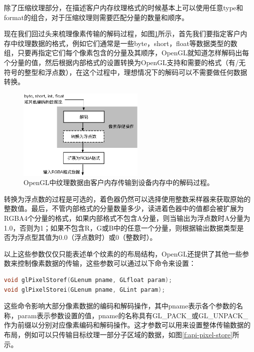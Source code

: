 除了压缩纹理部分，在描述客户内存纹理格式的时候基本上可以使用任意type和format的组合，对于压缩纹理则需要匹配分量的数量和顺序。

现在我们回过头来梳理像素传输的解码过程，如图\ref{f:api-unpack}所示，首先我们要指定客户内存中纹理数据的格式，例如它们通常是一些byte，short，float等数据类型的数组，只要再指定它们每个像素包含的分量及其顺序，OpenGL就知道怎样解码出每个分量的值，然后根据内部格式的设置转换为OpenGL支持和需要的格式（有/无符号的整型和浮点数），在这个过程中，理想情况下的解码可以不需要做任何数据转换。

\begin{figure}
\sidecaption
	\includegraphics[width=0.55\textwidth]{figures/api/unpack}
	\caption{OpenGL中纹理数据由客户内存传输到设备内存中的解码过程。}
	\label{f:api-unpack}
\end{figure}

转换为浮点数的过程是可选的，着色器仍然可以选择使用整数采样器来获取原始的整数值。最后，不管内部格式的分量数量多少，读进着色器中的值都会被扩展为RGBA4个分量的格式，如果内部格式不包含A分量，则当输出为浮点数时A分量为1.0，否则为1；如果不包含R，G或B中的任意一个分量，则根据输出数据类型是否为浮点型其值为0.0（浮点数时）或0（整数时）。

以上这些参数仅仅只能表述单个纹素的的布局结构，OpenGL还提供了其他一些参数来控制像素数据的传输，这些参数可以通过以下命令来设置：

\begin{lstlisting}[language=C++]
void glPixelStoref(GLenum pname​, GLfloat param​);
void glPixelStorei(GLenum pname​, GLint param​);
\end{lstlisting}

这些命令影响大部分像素数据的编码和解码操作，其中pname表示各个参数的名称，param表示参数设置的值，pname的名称具有GL\_PACK\_或GL\_UNPACK\_作为前缀以分别对应像素编码和解码操作。这才参数可以用来设置整体传输数据的布局，例如可以只传输目标纹理一部分子区域的数据，如图\ref{f:api-pixel-store}所示。

